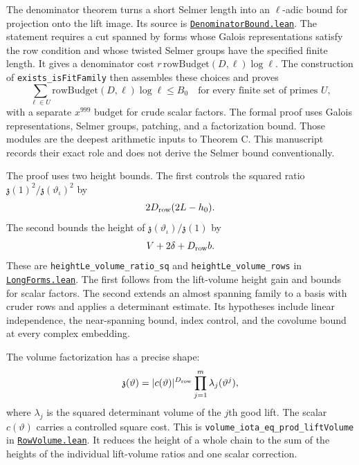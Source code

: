 \documentclass[11pt,oneside,openany]{amsbook}
\theoremstyle{remark}
\numberwithin{equation}{section}
\newcommand{\ghroot}{https://github.com/lsernau/grh-lean/blob/}
\newcommand{\ghrev}{72fead102f663d5c7a407964a13dc0cf9d977207}
\newcommand{\leanfile}[2]{%
  \href{\ghroot\ghrev/grh-compact/src/#1}{\nolinkurl{#2}}}
\begin{document}
The denominator theorem
 turns a short Selmer
length into
an $\ell$-adic bound for projection onto the lift image.
Its source is
\leanfile{New/Selmer/DenominatorBound.lean}%
{DenominatorBound.lean}.
The statement requires a cut spanned by forms whose
Galois representations satisfy the row condition and
whose twisted Selmer groups have the specified finite
length. It gives a denominator cost
$r\,\mathrm{rowBudget}(D,\ell)\log\ell$.
The construction of \texttt{exists\_isFitFamily}
then assembles these choices and proves
\begin{equation}
\label{eq:fit-budget}
\sum_{\ell\in U}
 \mathrm{rowBudget}(D,\ell)\log\ell\le B_0
\quad\text{for every finite set of primes }U,
\end{equation}
with a separate $x^{999}$ budget for crude scalar
factors. The formal proof uses Galois representations,
Selmer groups, patching, and a factorization bound.
Those modules are the deepest arithmetic inputs to
Theorem C. This manuscript records their exact role
and does not derive the Selmer bound conventionally.

The proof uses two height bounds. The first controls the
squared ratio $\mathfrak z(1)^2/
\mathfrak z(\vartheta_\iota)^2$ by
\begin{equation}
\label{eq:ratio-one}
2D_{\rm row}(2L-h_0).
\end{equation}
The second bounds the height of
$\mathfrak z(\vartheta_\iota)/\mathfrak z(1)$ by
\begin{equation}
\label{eq:ratio-two}
V+2\delta+D_{\rm row}b.
\end{equation}
These are \texttt{heightLe\_volume\_ratio\_sq} and
\texttt{heightLe\_volume\_rows} in
\leanfile{New/Endgame/LongForms.lean}{LongForms.lean}.
The first follows from the lift-volume height gain and bounds
for scalar factors. The second extends an almost spanning
family to a basis with cruder rows and applies a determinant
estimate. Its hypotheses include linear independence, the
near-spanning bound, index control, and the covolume bound at
every complex embedding.

The volume factorization has a precise shape:
\begin{equation}
\label{eq:volume-factorization}
\mathfrak z(\vartheta)
=|c(\vartheta)|^{D_{\rm row}}
 \prod_{j=1}^m\lambda_j(\vartheta^j),
\end{equation}
where $\lambda_j$ is the squared determinant volume of the
$j$th good lift. The scalar $c(\vartheta)$ carries a
controlled square cost. This is
\texttt{volume\_iota\_eq\_prod\_liftVolume} in
\leanfile{New/Rows/RowVolume.lean}{RowVolume.lean}.
It reduces the height of a whole chain to the sum of
the heights of the individual lift-volume ratios and
one scalar correction.
\end{document}
